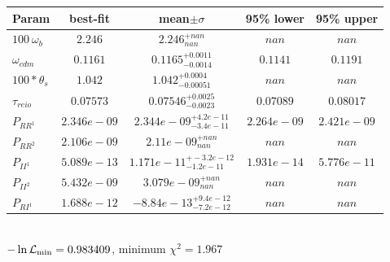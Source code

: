 \begin{tabular}{|l|c|c|c|c|} 
 \hline 
Param & best-fit & mean$\pm\sigma$ & 95\% lower & 95\% upper \\ \hline 
$100~\omega_{b }$ &$2.246$ & $2.246_{nan}^{+nan}$ & $nan$ & $nan$ \\ 
$\omega_{cdm }$ &$0.1161$ & $0.1165_{-0.0014}^{+0.0011}$ & $0.1141$ & $0.1191$ \\ 
$100*\theta_{s }$ &$1.042$ & $1.042_{-0.00051}^{+0.0004}$ & $nan$ & $nan$ \\ 
$\tau_{reio }$ &$0.07573$ & $0.07546_{-0.0023}^{+0.0025}$ & $0.07089$ & $0.08017$ \\ 
$P_{{RR}^1 }$ &$2.346e-09$ & $2.344e-09_{-3.4e-11}^{+4.2e-11}$ & $2.264e-09$ & $2.421e-09$ \\ 
$P_{{RR}^2 }$ &$2.106e-09$ & $2.11e-09_{nan}^{+nan}$ & $nan$ & $nan$ \\ 
$P_{{II}^1 }$ &$5.089e-13$ & $1.171e-11_{-1.2e-11}^{+-3.2e-12}$ & $1.931e-14$ & $5.776e-11$ \\ 
$P_{{II}^2 }$ &$5.432e-09$ & $3.079e-09_{nan}^{+nan}$ & $nan$ & $nan$ \\ 
$P_{{RI}^1 }$ &$1.688e-12$ & $-8.84e-13_{-7.2e-12}^{+9.4e-12}$ & $nan$ & $nan$ \\ 
\hline 
 \end{tabular} \\ 
$-\ln{\cal L}_\mathrm{min} =0.983409$, minimum $\chi^2=1.967$ \\ 
